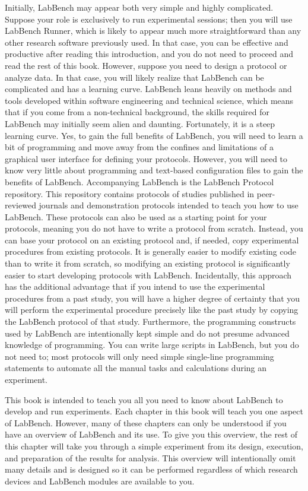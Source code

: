 Initially, LabBench may appear both very simple and highly complicated. Suppose your role is exclusively to run experimental sessions; then you will use LabBench Runner, which is likely to appear much more straightforward than any other research software previously used. In that case, you can be effective and productive after reading this introduction, and you do not need to proceed and read the rest of this book. However, suppose you need to design a protocol or analyze data. In that case, you will likely realize that LabBench can be complicated and has a learning curve. LabBench leans heavily on methods and tools developed within software engineering and technical science, which means that if you come from a non-technical background, the skills required for LabBench may initially seem alien and daunting. Fortunately, it is a steep learning curve. Yes, to gain the full benefits of LabBench, you will need to learn a bit of programming and move away from the confines and limitations of a graphical user interface for defining your protocols. However, you will need to know very little about programming and text-based configuration files to gain the benefits of LabBench. Accompanying LabBench is the LabBench Protocol repository. This repository contains protocols of studies published in peer-reviewed journals and demonstration protocols intended to teach you how to use LabBench. These protocols can also be used as a starting point for your protocols, meaning you do not have to write a protocol from scratch. Instead, you can base your protocol on an existing protocol and, if needed, copy experimental procedures from existing protocols. It is generally easier to modify existing code than to write it from scratch, so modifying an existing protocol is significantly easier to start developing protocols with LabBench. Incidentally, this approach has the additional advantage that if you intend to use the experimental procedures from a past study, you will have a higher degree of certainty that you will perform the experimental procedure precisely like the past study by copying the LabBench protocol of that study. Furthermore, the programming constructs used by LabBench are intentionally kept simple and do not presume advanced knowledge of programming. You can write large scripts in LabBench, but you do not need to; most protocols will only need simple single-line programming statements to automate all the manual tasks and calculations during an experiment.

This book is intended to teach you all you need to know about LabBench to develop and run experiments. Each chapter in this book will teach you one aspect of LabBench. However, many of these chapters can only be understood if you have an overview of LabBench and its use. To give you this overview, the rest of this chapter will take you through a simple experiment from its design, execution, and preparation of the results for analysis. This overview will intentionally omit many details and is designed so it can be performed regardless of which research devices and LabBench modules are available to you.

